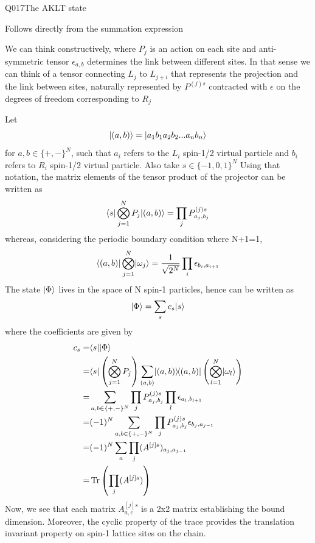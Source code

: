 \begin{entry}{Q017}{The AKLT state}
\begin{solution}[Part (d)]
\end{solution}

\begin{solution}[Part (e)]
Follows directly from the summation expression
\end{solution}

\begin{solution}[Part (f)]
We can think constructively, where $P_j$ is an action on each site and anti-symmetric tensor $\epsilon_{a,b}$ determines the link between different sites. In that sense we can think of a tensor connecting $L_j$ to $L_{j+i}$ that represents the projection and the link between sites, naturally represented by $P^{(j)s}$ contracted with $\epsilon$ on the degrees of freedom corresponding to $R_j$
\end{solution}

\begin{solution}[Part (g)]
Let
$$\lvert (a,b) \rangle=\lvert a_1b_1a_2b_2...a_nb_n \rangle$$ for $a,b \in \{+,-\}^N$, such that $a_i$ refers to the $L_i$ spin-1/2 virtual particle and $b_i$ refers to $R_i$ spin-1/2 virtual particle. Also take $s\in \{-1,0,1\}^N$
Using that notation, the matrix elements of the tensor product of the projector can be written as 
$$\langle s \vert \bigotimes_{j=1}^N P_j \vert (a,b) \rangle= \prod_j P^{(j)s}_{a_j,b_j}$$
whereas, considering the periodic boundary condition where N+1=1,
$$\langle (a,b) \rvert\bigotimes_{j=1}^N\lvert \omega_j \rangle= \frac{1}{\sqrt{2^N}}\prod_i \epsilon_{b_i,a_{i+1}}$$
The state $\lvert \Phi \rangle$ lives in the space of N spin-1 particles, hence can be written as 
\begin{equation}
    \lvert \Phi \rangle = \sum_{s } c_s \lvert s \rangle
\end{equation}
where the coefficients are given by 
\begin{equation}
\begin{split}
    c_s =& \langle s \rvert\lvert \Phi \rangle\\
    =& \langle s \rvert \left( \bigotimes_{j=1}^N P_j \right) \sum_{(a,b)} \lvert (a,b) \rangle\!\langle (a,b) \rvert \left(\bigotimes_{l=1}^N\lvert \omega_l \rangle\right)\\
    =& \sum_{a,b \in \{+,-\}^N}\prod_jP^{(j)s}_{a_j,b_j} \prod_l \epsilon_{a_l,b_{l+1}}\\
    =&(-1)^N \sum_{a,b \in \{+,-\}^N}\prod_jP^{(j)s}_{a_j,b_j} \epsilon_{b_j,a_{j-1}}\\
    =& (-1)^N \sum_{a} \prod_j (A^{[j]s})_{a_j,a_{j-1}}\\
    =& \operatorname{Tr} \left( \prod_j(A^{[j]s})\right)
\end{split}
\end{equation}
Now, we see that each matrix $A^{[j]s}_{a,c}$ is a 2x2 matrix establishing the bound dimension. Moreover, the cyclic property of the trace provides the translation invariant property on spin-1 lattice sites on the chain. 


\end{solution}
\end{entry}
